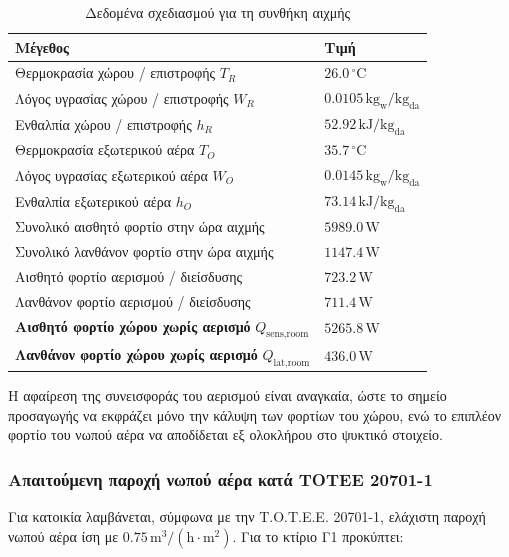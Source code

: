 \documentclass[12pt,a4paper]{article}
\begin{document}
\begin{table}[H]
\centering
\caption{Δεδομένα σχεδιασμού για τη συνθήκη αιχμής}
\label{tab:design_peak_data}
\begin{tabularx}{\textwidth}{L C{4.2cm}}
\toprule
\textbf{Μέγεθος} & \textbf{Τιμή} \\
\midrule
Θερμοκρασία χώρου / επιστροφής \(T_R\) & \(26.0\,^\circ\mathrm{C}\) \\
Λόγος υγρασίας χώρου / επιστροφής \(W_R\) & \(0.0105\,\mathrm{kg_w/kg_{da}}\) \\
Ενθαλπία χώρου / επιστροφής \(h_R\) & \(52.92\,\mathrm{kJ/kg_{da}}\) \\
Θερμοκρασία εξωτερικού αέρα \(T_O\) & \(35.7\,^\circ\mathrm{C}\) \\
Λόγος υγρασίας εξωτερικού αέρα \(W_O\) & \(0.0145\,\mathrm{kg_w/kg_{da}}\) \\
Ενθαλπία εξωτερικού αέρα \(h_O\) & \(73.14\,\mathrm{kJ/kg_{da}}\) \\
\midrule
Συνολικό αισθητό φορτίο στην ώρα αιχμής & \(5989.0\,\mathrm{W}\) \\
Συνολικό λανθάνον φορτίο στην ώρα αιχμής & \(1147.4\,\mathrm{W}\) \\
Αισθητό φορτίο αερισμού / διείσδυσης & \(723.2\,\mathrm{W}\) \\
Λανθάνον φορτίο αερισμού / διείσδυσης & \(711.4\,\mathrm{W}\) \\
\midrule
\textbf{Αισθητό φορτίο χώρου χωρίς αερισμό} \(Q_{\text{sens,room}}\) & \(\mathbf{5265.8\,\mathrm{W}}\) \\
\textbf{Λανθάνον φορτίο χώρου χωρίς αερισμό} \(Q_{\text{lat,room}}\) & \(\mathbf{436.0\,\mathrm{W}}\) \\
\bottomrule
\end{tabularx}
\end{table}

Η αφαίρεση της συνεισφοράς του αερισμού είναι αναγκαία, ώστε το σημείο προσαγωγής
να εκφράζει μόνο την κάλυψη των φορτίων του χώρου, ενώ το επιπλέον φορτίο του
νωπού αέρα να αποδίδεται εξ ολοκλήρου στο ψυκτικό στοιχείο.

\subsubsection{Απαιτούμενη παροχή νωπού αέρα κατά ΤΟΤΕΕ 20701-1}

Για κατοικία λαμβάνεται, σύμφωνα με την Τ.Ο.Τ.Ε.Ε. 20701-1, ελάχιστη παροχή νωπού
αέρα ίση με \(0.75\,\mathrm{m^3/(h\cdot m^2)}\). Για το κτίριο Γ1 προκύπτει:
\end{document}
